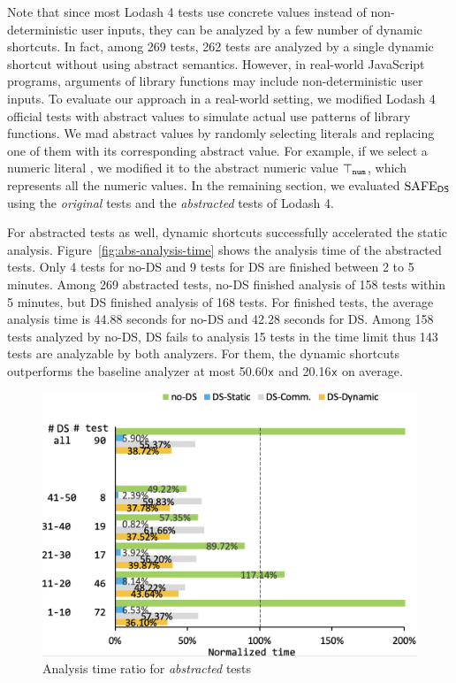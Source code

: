Note that since most Lodash 4 tests use concrete values instead of
non-deterministic user inputs, they can be analyzed by a few number of dynamic shortcuts.
In fact, among 269 tests, 262 tests are analyzed
by a single dynamic shortcut without using abstract semantics.
However, in real-world JavaScript programs, arguments of library
functions may include non-deterministic user inputs.
To evaluate our approach in a real-world setting,
we modified Lodash 4 official tests with abstract values to simulate actual use patterns of library functions.
We mad abstract values by randomly selecting literals and replacing
one of them with its corresponding abstract value.
For example, if we select a numeric literal , we modified it to the abstract numeric value
$\top_{\texttt{num}}$, which represents all the numeric values.
In the remaining section, we evaluated $\text{SAFE}_{\textsf{DS}}$ using the \textit{original} tests
and the \textit{abstracted} tests of Lodash 4.

For abstracted tests as well, dynamic shortcuts successfully accelerated the static analysis.
Figure~\ref{fig:abs-analysis-time} shows the analysis time of the abstracted tests.
Only 4 tests for no-DS and 9 tests for DS are finished between 2 to 5 minutes.
Among 269 abstracted tests, no-DS finished analysis of 158 tests within 5 minutes,
but DS finished analysis of 168 tests.  For finished tests, the average analysis
time is 44.88 seconds for no-DS and 42.28 seconds for DS. Among 158 tests analyzed by no-DS, DS
fails to analysis 15 tests in the time limit thus 143 tests are analyzable by
both analyzers.  For them, the dynamic shortcuts outperforms the baseline
analyzer at most 50.60${\textsf{x}}$ and 20.16${\textsf{x}}$ on average.

\begin{figure}[t]
  \centering
  \includegraphics[width=\linewidth]{img/abs-analysis-ratio}
  \vspace*{-1.5em}
  \caption{Analysis time ratio for  \textit{abstracted} tests}
  \label{fig:abs-analysis-ratio}
  \vspace*{-1.5em}
\end{figure}

